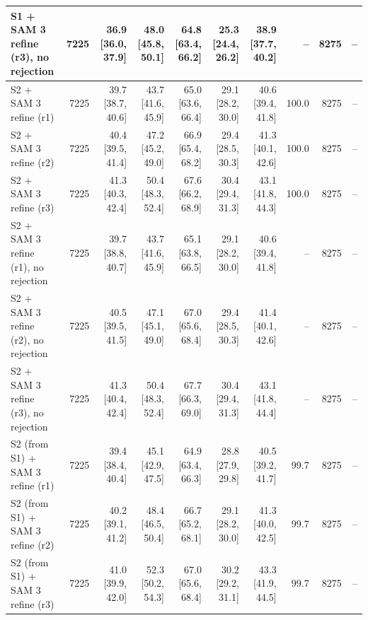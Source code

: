 \begin{tabular}{lrrrrrrrrr}
S1 + SAM 3 refine (r3), no rejection & 7225 & 36.9 \scriptsize{[36.0, 37.9]} & 48.0 \scriptsize{[45.8, 50.1]} & 64.8 \scriptsize{[63.4, 66.2]} & 25.3 \scriptsize{[24.4, 26.2]} & 38.9 \scriptsize{[37.7, 40.2]} & -- & 8275 & -- \\
\midrule
S2 + SAM 3 refine (r1) & 7225 & 39.7 \scriptsize{[38.7, 40.6]} & 43.7 \scriptsize{[41.6, 45.9]} & 65.0 \scriptsize{[63.6, 66.4]} & 29.1 \scriptsize{[28.2, 30.0]} & 40.6 \scriptsize{[39.4, 41.8]} & 100.0 & 8275 & -- \\
S2 + SAM 3 refine (r2) & 7225 & 40.4 \scriptsize{[39.5, 41.4]} & 47.2 \scriptsize{[45.2, 49.0]} & 66.9 \scriptsize{[65.4, 68.2]} & 29.4 \scriptsize{[28.5, 30.3]} & 41.3 \scriptsize{[40.1, 42.6]} & 100.0 & 8275 & -- \\
S2 + SAM 3 refine (r3) & 7225 & 41.3 \scriptsize{[40.3, 42.4]} & 50.4 \scriptsize{[48.3, 52.4]} & 67.6 \scriptsize{[66.2, 68.9]} & 30.4 \scriptsize{[29.4, 31.3]} & 43.1 \scriptsize{[41.8, 44.3]} & 100.0 & 8275 & -- \\
\midrule
S2 + SAM 3 refine (r1), no rejection & 7225 & 39.7 \scriptsize{[38.8, 40.7]} & 43.7 \scriptsize{[41.6, 45.9]} & 65.1 \scriptsize{[63.8, 66.5]} & 29.1 \scriptsize{[28.2, 30.0]} & 40.6 \scriptsize{[39.4, 41.8]} & -- & 8275 & -- \\
S2 + SAM 3 refine (r2), no rejection & 7225 & 40.5 \scriptsize{[39.5, 41.5]} & 47.1 \scriptsize{[45.1, 49.0]} & 67.0 \scriptsize{[65.6, 68.4]} & 29.4 \scriptsize{[28.5, 30.3]} & 41.4 \scriptsize{[40.1, 42.6]} & -- & 8275 & -- \\
S2 + SAM 3 refine (r3), no rejection & 7225 & 41.3 \scriptsize{[40.4, 42.4]} & 50.4 \scriptsize{[48.3, 52.4]} & 67.7 \scriptsize{[66.3, 69.0]} & 30.4 \scriptsize{[29.4, 31.3]} & 43.1 \scriptsize{[41.8, 44.4]} & -- & 8275 & -- \\
\midrule
S2 (from S1) + SAM 3 refine (r1) & 7225 & 39.4 \scriptsize{[38.4, 40.4]} & 45.1 \scriptsize{[42.9, 47.5]} & 64.9 \scriptsize{[63.4, 66.3]} & 28.8 \scriptsize{[27.9, 29.8]} & 40.5 \scriptsize{[39.2, 41.7]} & 99.7 & 8275 & -- \\
S2 (from S1) + SAM 3 refine (r2) & 7225 & 40.2 \scriptsize{[39.1, 41.2]} & 48.4 \scriptsize{[46.5, 50.4]} & 66.7 \scriptsize{[65.2, 68.1]} & 29.1 \scriptsize{[28.2, 30.0]} & 41.3 \scriptsize{[40.0, 42.5]} & 99.7 & 8275 & -- \\
S2 (from S1) + SAM 3 refine (r3) & 7225 & 41.0 \scriptsize{[39.9, 42.0]} & 52.3 \scriptsize{[50.2, 54.3]} & 67.0 \scriptsize{[65.6, 68.4]} & 30.2 \scriptsize{[29.2, 31.1]} & 43.3 \scriptsize{[41.9, 44.5]} & 99.7 & 8275 & -- \\

\end{tabular}

